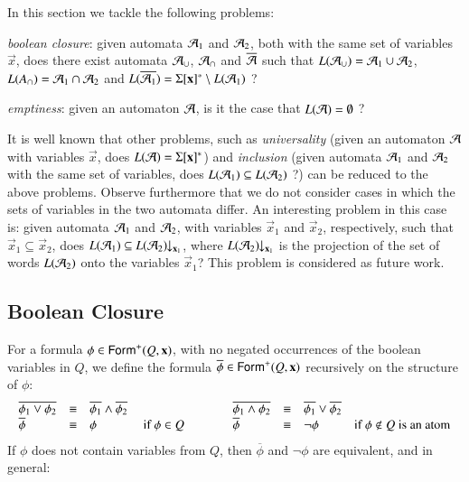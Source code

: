 \documentclass{llncs}
\begin{document}
In this section we tackle the following problems: \begin{compactitem}
\item \emph{boolean closure}: given automata $\mathcal{A}_1$ and $\mathcal{A}_2$, both
  with the same set of variables $\vec{x}$, does there exist automata
  $\mathcal{A}_\cup$, $\mathcal{A}_\cap$ and $\overline{\mathcal{A}}$ such that $L(\mathcal{A}_\cup) =
  \mathcal{A}_1 \cup \mathcal{A}_2$, $L(A_\cap) = \mathcal{A}_1 \cap \mathcal{A}_2$ and $L(\overline{\mathcal{A}_1})
  = \Sigma[\mathbf x]^* \setminus L(\mathcal{A}_1)$ ?
%
\item \emph{emptiness}: given an automaton $\mathcal{A}$, is it the case that
  $L(\mathcal{A}) = \emptyset$ ?
\end{compactitem}

It is well known that other problems, such as \emph{universality}
(given an automaton $\mathcal{A}$ with variables $\vec{x}$, does $L(\mathcal{A}) =
\Sigma[\mathbf x]^*$) and \emph{inclusion} (given automata $\mathcal{A}_1$ and
$\mathcal{A}_2$ with the same set of variables, does $L(\mathcal{A}_1) \subseteq
L(\mathcal{A}_2)$ ?) can be reduced to the above problems. Observe furthermore
that we do not consider cases in which the sets of variables in the
two automata differ. An interesting problem in this case is: given
automata $\mathcal{A}_1$ and $\mathcal{A}_2$, with variables $\vec{x}_1$ and
$\vec{x}_2$, respectively, such that $\vec{x}_1 \subseteq \vec{x}_2$,
does $L(\mathcal{A}_1) \subseteq {L(\mathcal{A}_2)}\!\!\downarrow_{{\mathbf x_1}}$, where
${L(\mathcal{A}_2)}\!\!\downarrow_{{\mathbf x_1}}$ is the projection of the set of words
$L(\mathcal{A}_2)$ onto the variables $\vec{x}_1$? This problem is considered
as future work.

\subsection{Boolean Closure}

For a formula $\phi \in \mathsf{Form}^+(Q,\mathbf x)$, with no negated
occurrences of the boolean variables in $Q$, we define the
formula $\overline{\phi} \in \mathsf{Form}^+(Q,\mathbf x)$ recursively on
the structure of $\phi$:
\[\begin{array}{lclclclc}
\overline{\phi_1 \vee \phi_2} & \equiv & \overline{\phi_1} \wedge \overline{\phi_2} && 
\overline{\phi_1 \wedge \phi_2} & \equiv & \overline{\phi_1} \vee \overline{\phi_2} \\
\overline{\phi} & \equiv & \phi & \text{ if $\phi \in Q$}\hspace*{1cm} &
\overline{\phi} & \equiv & \neg\phi & \text{if $\phi \not\in Q$ is an atom}
\end{array}\]
If $\phi$ does not contain variables from $Q$, then $\overline{\phi}$
and $\neg\phi$ are equivalent, and in general:
\end{document}
